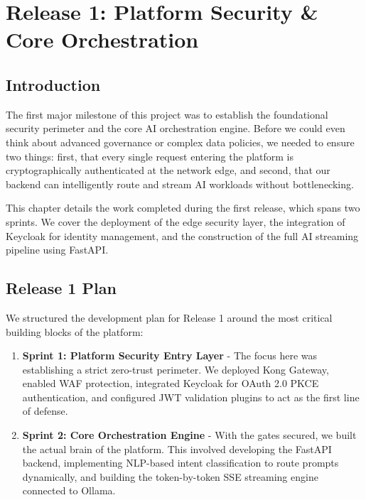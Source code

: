 \chapter{Release 1: Platform Security \& Core Orchestration}

\section{Introduction}

The first major milestone of this project was to establish the foundational security perimeter and the core AI orchestration engine. Before we could even think about advanced governance or complex data policies, we needed to ensure two things: first, that every single request entering the platform is cryptographically authenticated at the network edge, and second, that our backend can intelligently route and stream AI workloads without bottlenecking. 

This chapter details the work completed during the first release, which spans two sprints. We cover the deployment of the edge security layer, the integration of Keycloak for identity management, and the construction of the full AI streaming pipeline using FastAPI.

\section{Release 1 Plan}

We structured the development plan for Release 1 around the most critical building blocks of the platform:

\begin{enumerate}
    \item \textbf{Sprint 1: Platform Security Entry Layer} - The focus here was establishing a strict zero-trust perimeter. We deployed Kong Gateway, enabled WAF protection, integrated Keycloak for OAuth 2.0 PKCE authentication, and configured JWT validation plugins to act as the first line of defense.
    
    \item \textbf{Sprint 2: Core Orchestration Engine} - With the gates secured, we built the actual brain of the platform. This involved developing the FastAPI backend, implementing NLP-based intent classification to route prompts dynamically, and building the token-by-token SSE streaming engine connected to Ollama.
\end{enumerate}

